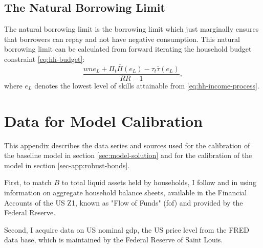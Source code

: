 \documentclass[12pt]{article} %
\numberwithin{equation}{section} %
\numberwithin{figure}{section}
\numberwithin{table}{section}
\begin{document}
\begin{refsection}
\begin{appendices}
\subsection{The Natural Borrowing Limit}
\label{sec:app-hh-borrowing}
The natural borrowing limit is the borrowing limit which just marginally ensures that borrowers can repay and not have negative consumption. This natural borrowing limit can be calculated from forward iterating the household budget constraint \eqref{eq:hh-budget}:
\begin{equation*}
    \frac{wne_{L} + \Pi_t \bar{\Pi} (e_{L}) - \tau_t \bar{\tau} (e_{L})}{RR - 1},
\end{equation*}
where $e_L$ denotes the lowest level of skills attainable from \eqref{eq:hh-income-process}.

\thispagestyle{plain}
\section{Data for Model Calibration}
\label{sec-app:data}

This appendix describes the data series and sources used for the calibration of the baseline model in section \ref{sec:model-solution} and for the calibration of the model in section \ref{sec-app:robust-bonds}.

First, to match $B$ to total liquid assets held by households, I follow \textcite{mckay2016} and \textcite{gl2017} in using information on aggregate household balance sheets, available in the Financial Accounts of the US Z1, known as "Flow of Funds" (\Gls{fof}) and provided by the Federal Reserve.

Second, I acquire data on US nominal \Gls{gdp}, the US price level from the FRED data base, which is maintained by the Federal Reserve of Saint Louis.


\end{appendices}
\end{refsection}
\end{document}
